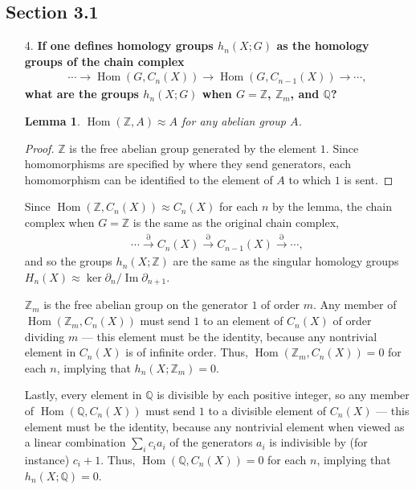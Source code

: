 \documentclass[a4paper,12pt]{article}
\DeclareMathOperator{\im}{Im}
\DeclareMathOperator{\Hom}{Hom}
\newtheorem{lemma}[theorem]{Lemma}
\begin{document}
\subsection*{Section 3.1}
\begin{enumerate}
    \item[4.]
        \sloppy
        \boldmath\textbf{If one defines homology groups $h_n(X; G)$ as the homology groups of the chain complex
            \begin{align*}
                \cdots \to \Hom\left( G, C_n(X) \right) \to \Hom \left( G, C_{n - 1}(X) \right) \to \cdots,
            \end{align*}
            what are the groups $h_n(X; G)$ when $G = \mathbb{Z}$, $\mathbb{Z}_m$, and $\mathbb{Q}$?
        }\unboldmath \par
        \begin{lemma}
            $\Hom(\mathbb{Z}, A) \approx A$ for any abelian group $A$.
        \end{lemma}
        \begin{proof}
            $\mathbb{Z}$ is the free abelian group generated by the element $1$. Since homomorphisms are specified by where they send generators, each homomorphism can be identified to the element of $A$ to which $1$ is sent.
        \end{proof}
        Since $\Hom(\mathbb{Z}, C_n(X)) \approx C_n(X)$ for each $n$ by the lemma, the chain complex when $G = \mathbb{Z}$ is the same as the original chain complex,
        \begin{align*}
            \cdots \xrightarrow{\partial} C_n(X) \xrightarrow{\partial} C_{n - 1}(X) \xrightarrow{\partial} \cdots,
        \end{align*}
        and so the groups $h_n(X; \mathbb{Z})$ are the same as the singular homology groups $H_n(X) \approx \ker\partial_n / \im\partial_{n + 1}$. \par
        $\mathbb{Z}_m$ is the free abelian group on the generator $1$ of order $m$. Any member of $\Hom(\mathbb{Z}_m, C_n(X))$ must send $1$ to an element of $C_n(X)$ of order dividing $m$ --- this element must be the identity, because any nontrivial element in $C_n(X)$ is of infinite order. Thus, $\Hom(\mathbb{Z}_m, C_n(X)) = 0$ for each $n$, implying that $h_n(X; \mathbb{Z}_m) = 0$. \par
        Lastly, every element in $\mathbb{Q}$ is divisible by each positive integer, so any member of $\Hom(\mathbb{Q}, C_n(X))$ must send $1$ to a divisible element of $C_n(X)$ --- this element must be the identity, because any nontrivial element when viewed as a linear combination $\sum_i c_i a_i$ of the generators $a_i$ is indivisible by (for instance) $c_i + 1$. Thus, $\Hom(\mathbb{Q}, C_n(X)) = 0$ for each $n$, implying that $h_n(X; \mathbb{Q}) = 0$.
\end{enumerate}
\end{document}
